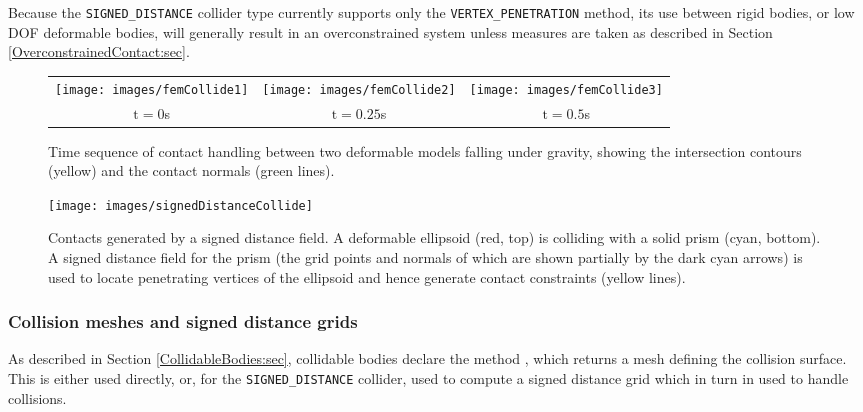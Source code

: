 \begin{description}
\begin{sideblock}
Because the {\tt SIGNED\_DISTANCE} collider type currently supports
only the {\tt VERTEX\_PENETRATION} method, its use between rigid
bodies, or low DOF deformable bodies, will generally result in an
overconstrained system unless measures are taken as described in
Section \ref{OverconstrainedContact:sec}.
\end{sideblock}

\end{description}

\begin{figure}[ht]
\begin{center}
        \begin{tabular}{ccc}
        \texttt{[image: images/femCollide1]} &
        \texttt{[image: images/femCollide2]} &
        \texttt{[image: images/femCollide3]}\\
         \large  $\mathrm{t}=0$s & \large $\mathrm{t}=0.25$s & \large $\mathrm{t}=0.5$s         
        \end{tabular}
\end{center}
\caption{Time sequence of contact handling between two deformable models 
falling under gravity, 
showing the intersection contours
(yellow) and the contact normals (green lines).}
\label{Collision:fig}
\end{figure}

\begin{figure}[ht]
\begin{center}
     \texttt{[image: images/signedDistanceCollide]}
\end{center}
\caption{Contacts generated by a signed distance field. A deformable
ellipsoid (red, top) is colliding with a solid prism (cyan, bottom).
A signed distance field for the prism (the grid points and normals of
which are shown partially by the dark cyan arrows) is used to locate
penetrating vertices of the ellipsoid and hence generate contact
constraints (yellow lines).}
\label{SDCollision:fig}
\end{figure}

\subsubsection{Collision meshes and signed distance grids}
\label{collisionMeshes:sec}

As described in Section \ref{CollidableBodies:sec}, collidable bodies
declare the method
,
which returns a mesh defining the collision surface.  This is either
used directly, or, for the {\tt SIGNED\_DISTANCE} collider, used
to compute a signed distance grid which in turn in used to handle
collisions.

